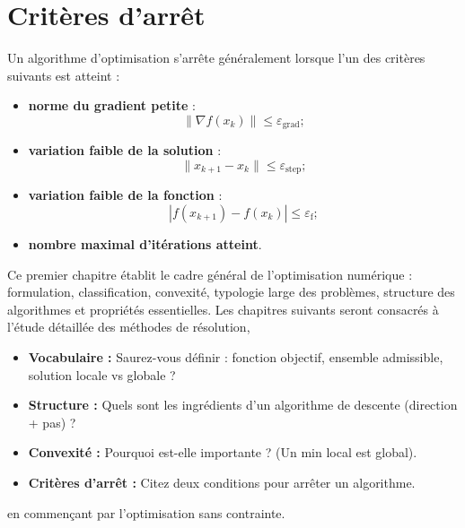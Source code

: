 \section{Critères d'arrêt}

Un algorithme d'optimisation s'arrête généralement lorsque l’un des critères suivants est atteint :

\begin{itemize}
  \item \textbf{norme du gradient petite} :
        \[
        \|\nabla f(x_k)\| \le \varepsilon_{\mathrm{grad}};
        \]
  \item \textbf{variation faible de la solution} :
        \[
        \|x_{k+1}-x_k\|\le \varepsilon_{\mathrm{step}};
        \]
  \item \textbf{variation faible de la fonction} :
        \[
        |f(x_{k+1})-f(x_k)|\le \varepsilon_{\mathrm{f}};
        \]
  \item \textbf{nombre maximal d’itérations atteint}.
\end{itemize}

\medskip

Ce premier chapitre établit le cadre général de l’optimisation numérique : formulation, classification,
convexité, typologie large des problèmes, structure des algorithmes et propriétés essentielles.
Les chapitres suivants seront consacrés à l’étude détaillée des méthodes de résolution,
\bigskip
\begin{checkpoint}
\begin{itemize}
    \item \textbf{Vocabulaire :} Saurez-vous définir : fonction objectif, ensemble admissible, solution locale vs globale ?
    \item \textbf{Structure :} Quels sont les ingrédients d'un algorithme de descente (direction + pas) ?
    \item \textbf{Convexité :} Pourquoi est-elle importante ? (Un min local est global).
    \item \textbf{Critères d'arrêt :} Citez deux conditions pour arrêter un algorithme.
\end{itemize}
\end{checkpoint}
en commençant par l’optimisation sans contrainte.
